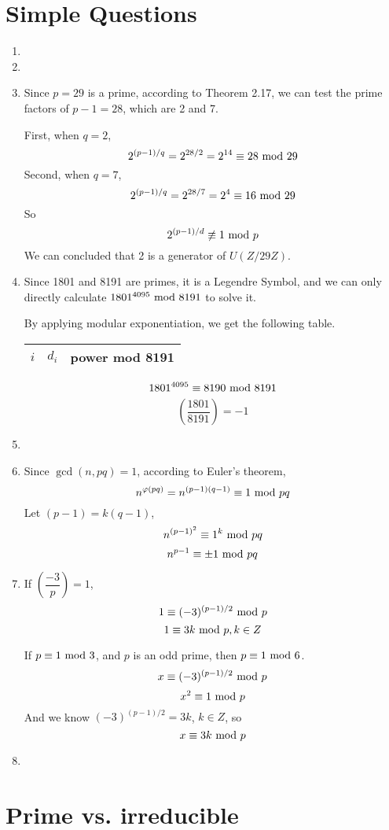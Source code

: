 \documentclass{article}
\renewcommand{\mod}{{\rm\ mod\ }}
\begin{document}
\section{Simple Questions}
\begin{enumerate}
\item

\item

\item
Since $p=29$ is a prime, according to Theorem 2.17, we can test the prime factors of $p-1=28$, which are 2 and 7. 

First, when $q=2$, $$2^{(p-1)/q}=2^{28/2}=2^{14}\equiv28\mod 29$$
Second, when $q=7$, $$2^{(p-1)/q}=2^{28/7}=2^{4}\equiv16\mod 29$$
So $$2^{(p-1)/d}\not\equiv1\mod p$$
We can concluded that 2 is a generator of $U(Z/29Z)$.

\item
Since 1801 and 8191 are primes, it is a Legendre Symbol, and we can only directly calculate $1801^{4095}\mod8191$ to solve it.

By applying modular exponentiation, we get the following table.
\begin{center}
\begin{tabular}{ccc}
$i$ & $d_i$ & power mod 8191 \\\hline

\end{tabular}
\end{center}
$$1801^{4095}\equiv8190\mod8191$$
$$\left(\frac{1801}{8191}\right)=-1$$

\item

\item
Since $\gcd(n,pq)=1$, according to Euler's theorem, $$n^{\varphi(pq)}=n^{(p-1)(q-1)}\equiv1\mod pq$$
Let $(p-1)=k(q-1)$,
$$n^{(p-1)^2}\equiv1^k\mod pq$$
$$n^{p-1}\equiv\pm1\mod pq$$
\item
If $\left(\dfrac{-3}{p}\right)=1$,
$$1\equiv(-3)^{(p-1)/2}\mod p$$
$$1\equiv3k\mod p,k\in Z$$



If $p\equiv1\mod3$, and $p$ is an odd prime, then $p\equiv1\mod6$.
$$x\equiv(-3)^{(p-1)/2}\mod p$$
$$x^2\equiv 1\mod p$$
And we know $(-3)^{(p-1)/2}=3k$, $k\in Z$, so
$$x\equiv 3k\mod p$$
\item

\end{enumerate}

\section{Prime vs. irreducible}
\end{document}
